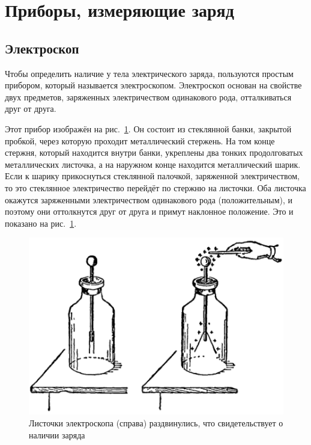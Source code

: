 \documentclass[pscyr]{hedwork}
\begin{document}
  \maketitle
  \tableofcontents

  \section{Приборы, измеряющие заряд}
  \subsection{Электроскоп}
  Чтобы определить наличие у тела электрического заряда, пользуются простым
  прибором, который называется электроскопом. Электроскоп основан на свойстве
  двух предметов, заряженных электричеством одинакового рода, отталкиваться друг
  от друга.

  Этот прибор изображён на рис.~\ref{picElec}. Он состоит из стеклянной банки,
  закрытой пробкой, через которую проходит металлический стержень. На том конце
  стержня, который находится внутри банки, укреплены два тонких продолговатых
  металлических листочка, а на наружном конце находится металлический шарик.
  Если к шарику прикоснуться стеклянной палочкой, заряженной электричеством, то
  это стеклянное электричество перейдёт по стержню на листочки. Оба листочка
  окажутся заряженными электричеством одинакового рода (положительным), и
  поэтому они оттолкнутся друг от друга и примут наклонное положение. Это и
  показано на рис.~\ref{picElec}.

  \begin{figure}[ht]
    \center
    \includegraphics{sl_1_1}
    \parbox{.8\textwidth}{\caption{Листочки электроскопа (справа) раздвинулись,
      что свидетельствует о наличии заряда} \label{picElec}}
  \end{figure}
\end{document}
